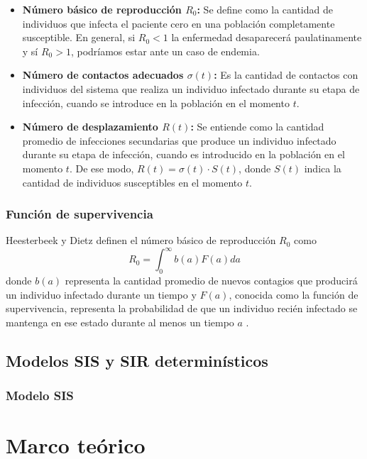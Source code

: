 \documentclass{article}
\begin{document}
\begin{itemize}
    \item \textbf{Número básico de reproducción $R_0$:} Se define como la cantidad de individuos que infecta el paciente cero en una población completamente susceptible. En general, si $R_0<1$ la enfermedad desaparecerá paulatinamente y sí $R_0>1$, podríamos estar ante un caso de endemia.
    \item \textbf{Número de contactos adecuados $\sigma(t)$:} Es la cantidad de contactos con individuos del sistema que realiza un individuo infectado durante su etapa de infección, cuando se introduce en la población en el momento $t$.
    \item \textbf{Número de desplazamiento $R(t)$:} Se entiende como la cantidad promedio de infecciones secundarias que produce un individuo infectado durante su etapa de infección, cuando es introducido en la población en el momento $t$. De ese modo, $R(t) = \sigma(t)\cdot S(t)$, donde $S(t)$ indica la cantidad de individuos susceptibles en el momento $t$.
\end{itemize}

\subsubsection{Función de supervivencia}
Heesterbeek y Dietz definen el número básico de reproducción $R_0$ como
\begin{equation}
    R_0 = \int_0^\infty b(a)F(a) da
\end{equation}
donde $b(a)$ representa la cantidad promedio de nuevos contagios que producirá un individuo infectado durante un tiempo y $F(a)$, conocida como la función de supervivencia, representa la probabilidad de que un individuo recién infectado se mantenga en ese estado durante al menos un tiempo $a$ \cite{conceptOfR0, perspectivesOnR0}.

\subsection{Modelos SIS y SIR determinísticos}
\subsubsection{Modelo SIS}


\section{Marco teórico}
\end{document}
